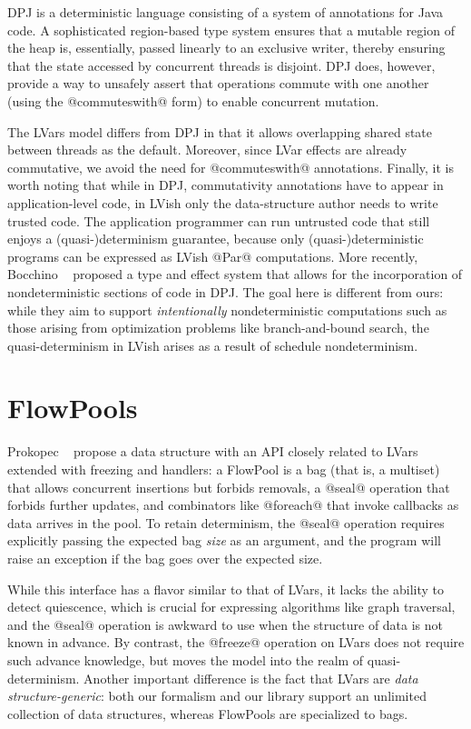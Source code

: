 DPJ \cite{dpj-oopsla, dpj-hotpar09} is a deterministic language
consisting of a system of annotations for Java code.  A sophisticated
region-based type system ensures that a mutable region of the heap is,
essentially, passed linearly to an exclusive writer, thereby ensuring
that the state accessed by concurrent threads is disjoint.  DPJ does,
however, provide a way to unsafely assert that operations commute with
one another (using the @commuteswith@ form) to enable concurrent
mutation.

The LVars model differs from DPJ in that it allows overlapping shared
state between threads as the default.  Moreover, since LVar effects
are already commutative, we avoid the need for @commuteswith@
annotations.  Finally, it is worth noting that while in DPJ,
commutativity annotations have to appear in application-level code, in
LVish only the data-structure author needs to write trusted code. The
application programmer can run untrusted code that still enjoys a
(quasi-)determinism guarantee, because only (quasi-)deterministic
programs can be expressed as LVish @Par@ computations.
More recently, Bocchino \etal~ proposed a type and
effect system that allows for the incorporation of nondeterministic
sections of code in DPJ.  The goal here is different from ours: while
they aim to support \emph{intentionally} nondeterministic computations
such as those arising from optimization problems like branch-and-bound
search, the quasi-determinism in LVish arises as a result of schedule
nondeterminism.

\section{FlowPools}

Prokopec \etal~ propose a data structure with an API
closely related to LVars extended with freezing and handlers: a
FlowPool is a bag (that is, a multiset) that allows concurrent
insertions but forbids removals, a @seal@ operation that forbids
further updates, and combinators like @foreach@ that invoke callbacks
as data arrives in the pool.  To retain determinism, the @seal@
operation requires explicitly passing the expected bag \emph{size} as
an argument, and the program will raise an exception if the bag goes
over the expected size.

While this interface has a flavor similar to that of LVars, it lacks
the ability to detect quiescence, which is crucial for expressing
algorithms like graph traversal, and the @seal@ operation is awkward
to use when the structure of data is not known in advance.  By
contrast, the @freeze@ operation on LVars does not require such
advance knowledge, but moves the model into the realm of
quasi-determinism.  Another important difference is the fact that
LVars are \emph{data structure-generic}: both our formalism and our
library support an unlimited collection of data structures, whereas
FlowPools are specialized to bags.

